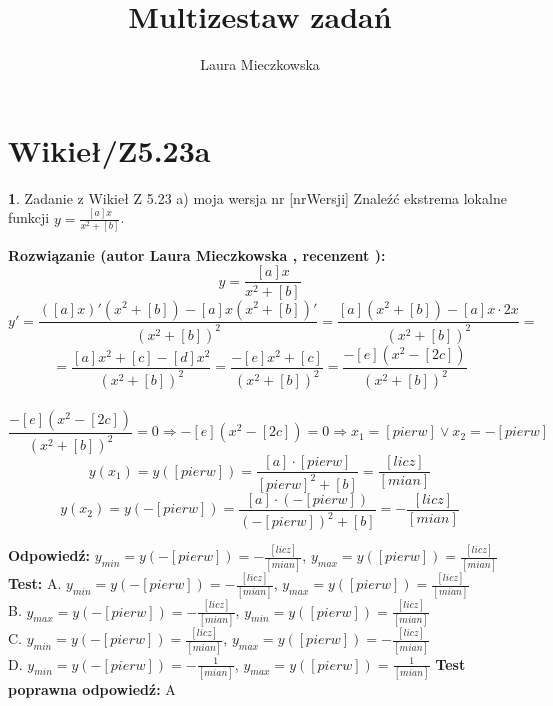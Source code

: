\documentclass[12pt, a4paper]{article}
\title{Multizestaw zadań}
\author{Laura Mieczkowska}
\date{}
\theoremstyle{definition} %
\newtheorem{zad}{}
\newcommand{\kategoria}[1]{\section{#1}} %
\newcommand{\zadStart}[1]{\begin{zad}#1\newline} %
\newcommand{\zadStop}{\end{zad}}   %
\newcommand{\rozwStart}[2]{\noindent \textbf{Rozwiązanie (autor #1 , recenzent #2): }\newline} %
\newcommand{\odpStart}{\noindent \textbf{Odpowiedź:}\newline}    %
\newcommand{\odpStop}{\newline}                                             %
\newcommand{\testStart}{\noindent \textbf{Test:}\newline} %
\newcommand{\testStop}{\newline} %
\newcommand{\kluczStart}{\noindent \textbf{Test poprawna odpowiedź:}\newline} %
\newcommand{\kluczStop}{\newline} %
\begin{document}
\maketitle


\kategoria{Wikieł/Z5.23a}
\zadStart{Zadanie z Wikieł Z 5.23 a) moja wersja nr [nrWersji]}
Znaleźć ekstrema lokalne funkcji $y=\frac{[a]x}{x^2+[b]}$.
\zadStop
\rozwStart{Laura Mieczkowska}{}
$$y=\frac{[a]x}{x^2+[b]}$$
$$y'=\frac{([a]x)'(x^2+[b])-[a]x(x^2+[b])'}{(x^2+[b])^2}=
\frac{[a](x^2+[b])-[a]x\cdot2x}{(x^2+[b])^2}=$$
$$=\frac{[a]x^2+[c]-[d]x^2}{(x^2+[b])^2}=\frac{-[e]x^2+[c]}{(x^2+[b])^2}=\frac{-[e](x^2-[2c])}{(x^2+[b])^2}$$
\\
$$\frac{-[e](x^2-[2c])}{(x^2+[b])^2}=0 \Rightarrow -[e](x^2-[2c])=0 \Rightarrow
x_1=[pierw] \vee x_2=-[pierw]$$
$$y(x_1)=y([pierw])=\frac{[a]\cdot[pierw]}{[pierw]^2+[b]}=\frac{[licz]}{[mian]}$$
$$y(x_2)=y(-[pierw])=\frac{[a]\cdot(-[pierw])}{(-[pierw])^2+[b]}=-\frac{[licz]}{[mian]}$$

\odpStart
$y_{min}=y(-[pierw])=-\frac{[licz]}{[mian]}$, $y_{max}=y([pierw])=\frac{[licz]}{[mian]}$
\odpStop
\testStart
A. $y_{min}=y(-[pierw])=-\frac{[licz]}{[mian]}$, $y_{max}=y([pierw])=\frac{[licz]}{[mian]}$\\
B. $y_{max}=y(-[pierw])=-\frac{[licz]}{[mian]}$, $y_{min}=y([pierw])=\frac{[licz]}{[mian]}$ \\
C. $y_{min}=y(-[pierw])=\frac{[licz]}{[mian]}$, $y_{max}=y([pierw])=-\frac{[licz]}{[mian]}$ \\
D. $y_{min}=y(-[pierw])=-\frac{1}{[mian]}$, $y_{max}=y([pierw])=\frac{1}{[mian]}$ 
\testStop
\kluczStart
A
\kluczStop
\end{document}
